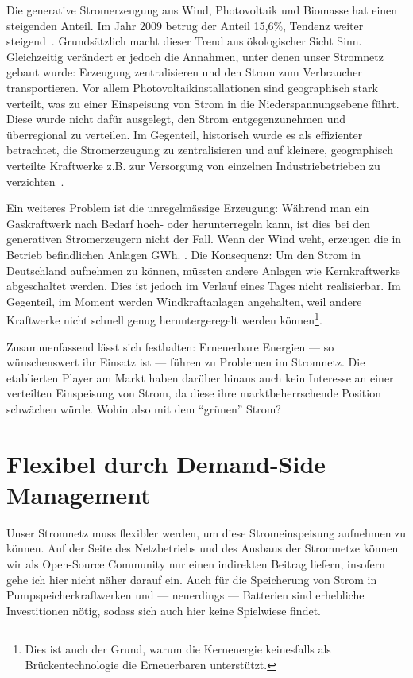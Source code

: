 \documentclass[12pt,BCOR=8.5mm]{scrartcl}
\begin{document}
Die generative Stromerzeugung aus Wind, Photovoltaik und Biomasse hat
einen steigenden Anteil. Im Jahr 2009 betrug der Anteil 15,6\%, Tendenz
weiter steigend~\cite{web:bmwi-energiedaten}. Grundsätzlich macht dieser
Trend aus ökologischer Sicht Sinn. Gleichzeitig verändert er jedoch die
Annahmen, unter denen unser Stromnetz gebaut wurde: Erzeugung
zentralisieren und den Strom zum Verbraucher transportieren. Vor allem
Photovoltaikinstallationen sind geographisch stark verteilt, was zu
einer Einspeisung von Strom in die Niederspannungsebene führt. Diese
wurde nicht dafür ausgelegt, den Strom entgegenzunehmen und überregional
zu verteilen. Im Gegenteil, historisch wurde es als effizienter
betrachtet, die Stromerzeugung zu zentralisieren und auf kleinere,
geographisch verteilte Kraftwerke z.B. zur Versorgung von einzelnen
Industriebetrieben zu verzichten~\cite{carr08switch}.

Ein weiteres Problem ist die unregelmässige Erzeugung: Während man ein
Gaskraftwerk nach Bedarf hoch- oder herunterregeln kann, ist dies bei
den generativen Stromerzeugern nicht der Fall. Wenn der Wind weht,
erzeugen die in Betrieb befindlichen Anlagen 
GWh. . Die Konsequenz: Um den
Strom in Deutschland aufnehmen zu können, müssten andere Anlagen wie
Kernkraftwerke abgeschaltet werden. Dies ist jedoch im Verlauf eines
Tages nicht realisierbar. Im Gegenteil, im Moment werden
Windkraftanlagen angehalten, weil andere Kraftwerke nicht schnell genug
heruntergeregelt werden können\footnote{Dies ist auch der Grund, warum die
Kernenergie keinesfalls als Brückentechnologie die Erneuerbaren
unterstützt.}. 

Zusammenfassend lässt sich festhalten: Erneuerbare Energien --- so
wünschenswert ihr Einsatz ist --- führen zu Problemen im Stromnetz. Die
etablierten Player am Markt haben darüber hinaus auch kein Interesse an
einer verteilten Einspeisung von Strom, da diese ihre marktbeherrschende
Position schwächen würde. Wohin also mit dem "`grünen"' Strom?

\section{Flexibel durch Demand-Side Management}\label{sec:demand-side_management}

Unser Stromnetz muss flexibler werden, um diese Stromeinspeisung
aufnehmen zu können. Auf der Seite des Netzbetriebs und des Ausbaus der
Stromnetze können wir als Open-Source Community nur einen indirekten
Beitrag liefern, insofern gehe ich hier nicht näher darauf ein. Auch für
die Speicherung von Strom in Pumpspeicherkraftwerken und --- neuerdings
--- Batterien sind erhebliche Investitionen nötig, sodass sich auch hier
keine Spielwiese findet.
\end{document}
